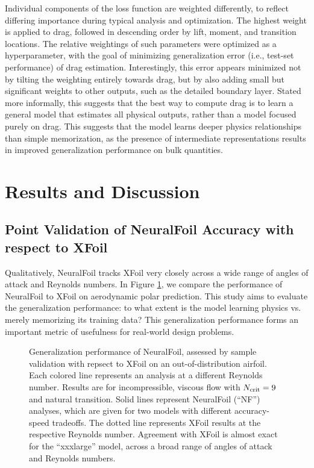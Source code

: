 Individual components of the loss function are weighted differently, to reflect differing importance during typical analysis and optimization. The highest weight is applied to drag, followed in descending order by lift, moment, and transition locations. The relative weightings of such parameters were optimized as a hyperparameter, with the goal of minimizing generalization error (i.e., test-set performance) of drag estimation. Interestingly, this error appears minimized not by tilting the weighting entirely towards drag, but by also adding small but significant weights to other outputs, such as the detailed boundary layer. Stated more informally, this suggests that the best way to compute drag is to learn a general model that estimates all physical outputs, rather than a model focused purely on drag. This suggests that the model learns deeper physics relationships than simple memorization, as the presence of intermediate representations results in improved generalization performance on bulk quantities.


\section{Results and Discussion}
\label{sec:nf-results}

\subsection{Point Validation of NeuralFoil Accuracy with respect to XFoil}
\label{sec:nf-validation-basic}

Qualitatively, NeuralFoil tracks XFoil very closely across a wide range of angles of attack and Reynolds numbers. In Figure \ref{fig:nf-clcd-polar}, we compare the performance of NeuralFoil to XFoil on aerodynamic polar prediction. This study aims to evaluate the generalization performance: to what extent is the model learning physics vs. merely memorizing its training data? This generalization performance forms an important metric of usefulness for real-world design problems.

\begin{figure}[H]
    \centering
    
    \caption{Generalization performance of NeuralFoil, assessed by sample validation with repsect to XFoil on an out-of-distribution airfoil. Each colored line represents an analysis at a different Reynolds number. Results are for incompressible, viscous flow with $N_{\rm crit}=9$ and natural transition. Solid lines represent NeuralFoil (``NF'') analyses, which are given for two models with different accuracy-speed tradeoffs. The dotted line represents XFoil results at the respective Reynolds number. Agreement with XFoil is almost exact for the ``xxxlarge'' model, across a broad range of angles of attack and Reynolds numbers.}
    \label{fig:nf-clcd-polar}
\end{figure}

